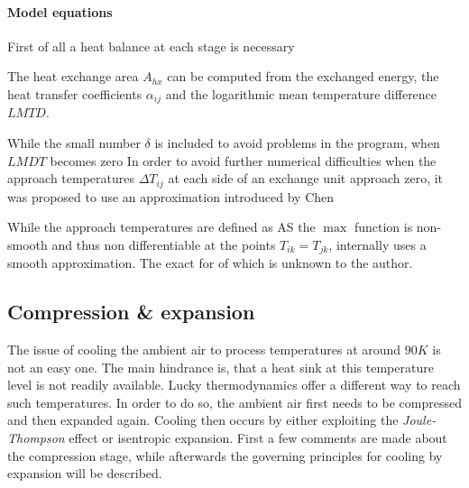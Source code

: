     \paragraph{Model equations}

    First of all a heat balance at each stage is necessary

    The heat exchange area $A_{hx}$ can be computed from the exchanged energy, the heat transfer coefficients $\alpha_{ij}$
    and the logarithmic mean temperature difference $LMTD$.

    While the small number $\delta$ is included to avoid problems in the program, when $LMDT$ becomes zero
    In order to avoid further numerical difficulties when the approach temperatures $\Delta T_{ij}$ at each side of an exchange
    unit approach zero, it was proposed to use an approximation introduced by Chen \cite{Chen.1987}

    While the approach temperatures are defined as
    AS the $\max$ function is non-smooth and thus non differentiable at the points $T_{ik} = T_{jk}$, \gproms internally uses a smooth
    approximation. The exact for of which is unknown to the author.

\subsection{Compression \& expansion}
\label{sec:mathpro:steady:comp}
    The issue of cooling the ambient air to process temperatures at around $90 K$ is not an easy
    one. The main hindrance is, that a heat sink at this temperature level is not readily available.
    Lucky thermodynamics offer a different way to reach such temperatures. In order to do so,
    the ambient air first needs to be compressed and then expanded again. Cooling then occurs
    by either exploiting the \emph{Joule-Thompson} effect or isentropic expansion. First a few
    comments are made about the compression stage, while afterwards the governing principles
    for cooling by expansion will be described.

